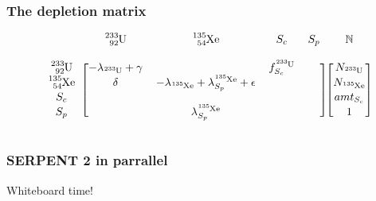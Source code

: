 \documentclass{beamer}
\begin{document}
\begin{frame}
\frametitle{The depletion matrix}

    \begin{equation*}
        \begin{blockarray}{cccccc}
             &
            \ce{^{233}_{92}U} &
            \ce{^{135}_{54}Xe} &
            S_{c} &
            S_{p} &
            \mathbb{N} \\
             &
             &
             &
             &
             &
             \\ 
        \begin{block}{c[cccc][c]}
            \ce{^{233}_{92}U} &
            -\lambda_{\ce{^{233}U}} + \gamma &
             &
            f_{S_{c}}^{\ce{^{233}U}} &
             &
            N_{\ce{^{233}U}} \\
            \ce{^{135}_{54}Xe} &
            \delta &
            -\lambda_{\ce{^{135}Xe}} + \lambda_{S_{p}}^{\ce{^{135}Xe}} +
                \epsilon &
             &
             &
            N_{\ce{^{135}Xe}} \\
            S_{c} &
             &
             &
             &
             &
            amt_{S_{c}} \\
            S_{p} &
             &
            \lambda_{S_{p}}^{\ce{^{135}Xe}} &
             &
             &
             1\\
        \end{block}
        \end{blockarray}
    \end{equation*}

\end{frame}

\begin{frame}
\frametitle{SERPENT 2 in parrallel}

    Whiteboard time!

\end{frame}
\end{document}
